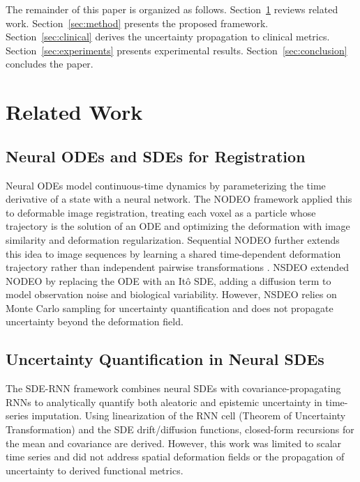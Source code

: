 \documentclass[10pt,twocolumn]{article}
\begin{document}
The remainder of this paper is organized as follows. Section~\ref{sec:related} reviews related work. Section~\ref{sec:method} presents the proposed framework. Section~\ref{sec:clinical} derives the uncertainty propagation to clinical metrics. Section~\ref{sec:experiments} presents experimental results. Section~\ref{sec:conclusion} concludes the paper.

\section{Related Work}
\label{sec:related}

\subsection{Neural ODEs and SDEs for Registration}

Neural ODEs \cite{chen2018neural} model continuous-time dynamics by parameterizing the time derivative of a state with a neural network. The NODEO framework \cite{wu2022nodeo} applied this to deformable image registration, treating each voxel as a particle whose trajectory is the solution of an ODE and optimizing the deformation with image similarity and deformation regularization. Sequential NODEO further extends this idea to image sequences by learning a shared time-dependent deformation trajectory rather than independent pairwise transformations \cite{wu2024sequentialnodeo}. NSDEO extended NODEO by replacing the ODE with an It\^{o} SDE, adding a diffusion term to model observation noise and biological variability. However, NSDEO relies on Monte Carlo sampling for uncertainty quantification and does not propagate uncertainty beyond the deformation field.

\subsection{Uncertainty Quantification in Neural SDEs}

The SDE-RNN framework \cite{dahale2023general} combines neural SDEs with covariance-propagating RNNs to analytically quantify both aleatoric and epistemic uncertainty in time-series imputation. Using linearization of the RNN cell (Theorem of Uncertainty Transformation) and the SDE drift/diffusion functions, closed-form recursions for the mean and covariance are derived. However, this work was limited to scalar time series and did not address spatial deformation fields or the propagation of uncertainty to derived functional metrics.
\end{document}
